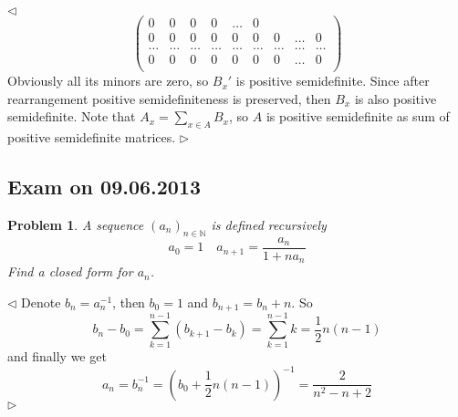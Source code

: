 \documentclass[12pt]{article}
\newtheorem{problem}{Problem}[subsection]
\newenvironment{solution}{\par $\triangleleft$}{$\triangleright$}
\begin{document}
\begin{solution}
$$\begin{pmatrix}
            0      &
            0      &
            0      &
            0      &
            \ldots &
            0        \\
            0      &
            0      &
            0      &
            0      &
            0      &
            0      &
            0      &
            \ldots &
            0        \\
            \hdots &
            \hdots &
            \hdots &
            \hdots &
            \hdots &
            \hdots &
            \hdots &
            \hdots &
            \hdots   \\
            0      &
            0      &
            0      &
            0      &
            0      &
            0      &
            0      &
            \ldots &
            0        \\
        \end{pmatrix}
    $$
    Obviously all its minors are zero, so $B_x'$ is positive semidefinite. Since
    after rearrangement positive semidefiniteness is preserved, then $B_x$ is
    also positive semidefinite. Note that $A_x=\sum_{x\in A} B_x$, so $A$ is
    positive semidefinite as sum of positive semidefinite matrices.
\end{solution}
















\newpage

\subsection{Exam on 09.06.2013}

\begin{problem} A sequence ${(a_n)}_{n\in\mathbb{N}}$ is defined recursively
$$
    a_0=1\quad a_{n+1}=\frac{a_n}{1+n a_n}
$$
Find a closed form for $a_n$.
\end{problem}
\begin{solution} Denote $b_n=a_n^{-1}$, then $b_0=1$ and $b_{n+1}=b_n+n$. So
    $$
        b_n-b_0=\sum_{k=1}^{n-1}(b_{k+1}-b_k)=\sum_{k=1}^{n-1}k
        =\frac{1}{2}n(n-1)
    $$
    and finally we get
    $$
        a_n=b_n^{-1}={\left(b_0+\frac{1}{2}n(n-1)\right)}^{-1}
        =\frac{2}{n^2-n+2}
    $$
\end{solution}
\end{document}
